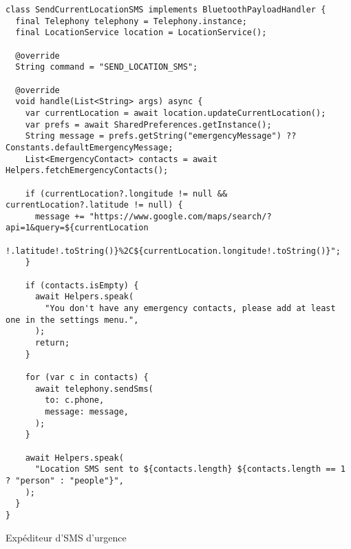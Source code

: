 \begin{code}
\begin{verbatim}
class SendCurrentLocationSMS implements BluetoothPayloadHandler {
  final Telephony telephony = Telephony.instance;
  final LocationService location = LocationService();

  @override
  String command = "SEND_LOCATION_SMS";

  @override
  void handle(List<String> args) async {
    var currentLocation = await location.updateCurrentLocation();
    var prefs = await SharedPreferences.getInstance();
    String message = prefs.getString("emergencyMessage") ?? Constants.defaultEmergencyMessage;
    List<EmergencyContact> contacts = await Helpers.fetchEmergencyContacts();

    if (currentLocation?.longitude != null && currentLocation?.latitude != null) {
      message += "https://www.google.com/maps/search/?api=1&query=${currentLocation
      !.latitude!.toString()}%2C${currentLocation.longitude!.toString()}";
    }

    if (contacts.isEmpty) {
      await Helpers.speak(
        "You don't have any emergency contacts, please add at least one in the settings menu.",
      );
      return;
    }

    for (var c in contacts) {
      await telephony.sendSms(
        to: c.phone,
        message: message,
      );
    }

    await Helpers.speak(
      "Location SMS sent to ${contacts.length} ${contacts.length == 1 ? "person" : "people"}",
    );
  }
}
\end{verbatim}
\caption{Expéditeur d'SMS d'urgence}
\end{code}